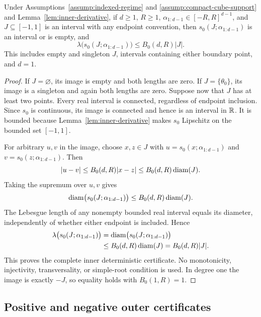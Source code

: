 \begin{lemma}
\label{lem:inner-image-length}
Under Assumptions~\ref{assump:indexed-regime} and
\ref{assump:compact-cube-support} and Lemma~\ref{lem:inner-derivative}, if
$d\geq1$, $R\geq1$, $\alpha_{1:d-1}\in[-R,R]^{d-1}$, and
$J\subseteq[-1,1]$ is an interval with any endpoint convention, then
$s_0(J;\alpha_{1:d-1})$ is an interval or is empty, and
\[
\lambda\bigl(s_0(J;\alpha_{1:d-1})\bigr)
\leq B_0(d,R)|J|.
\]
This includes empty and singleton $J$, intervals containing either boundary
point, and $d=1$.
\end{lemma}

\begin{proof}
If $J=\varnothing$, its image is empty and both lengths are zero.  If
$J=\{\theta_0\}$, its image is a singleton and again both lengths are zero.
Suppose now that $J$ has at least two points.  Every real interval is
connected, regardless of endpoint inclusion.  Since $s_0$ is continuous,
its image is connected and hence is an interval in $\mathbb{R}$.  It is bounded
because Lemma~\ref{lem:inner-derivative} makes $s_0$ Lipschitz on the bounded
set $[-1,1]$.

For arbitrary $u,v$ in the image, choose $x,z\in J$ with
$u=s_0(x;\alpha_{1:d-1})$ and $v=s_0(z;\alpha_{1:d-1})$.  Then
\[
|u-v|\leq B_0(d,R)|x-z|
\leq B_0(d,R)\operatorname{diam}(J).
\]
Taking the supremum over $u,v$ gives
\[
\operatorname{diam}\bigl(s_0(J;\alpha_{1:d-1})\bigr)
\leq B_0(d,R)\operatorname{diam}(J).
\]
The Lebesgue length of any nonempty bounded real interval equals its diameter,
independently of whether either endpoint is included.  Hence
\[
\begin{aligned}
\lambda\bigl(s_0(J;\alpha_{1:d-1})\bigr)
&=\operatorname{diam}\bigl(s_0(J;\alpha_{1:d-1})\bigr)\\
&\leq B_0(d,R)\operatorname{diam}(J)
=B_0(d,R)|J|.
\end{aligned}
\]
This proves the complete inner deterministic certificate.  No monotonicity,
injectivity, transversality, or simple-root condition is used.  In degree one
the image is exactly $-J$, so equality holds with $B_0(1,R)=1$.
\end{proof}

\subsection{Positive and negative outer certificates}
\label{app:outer-certificates}

